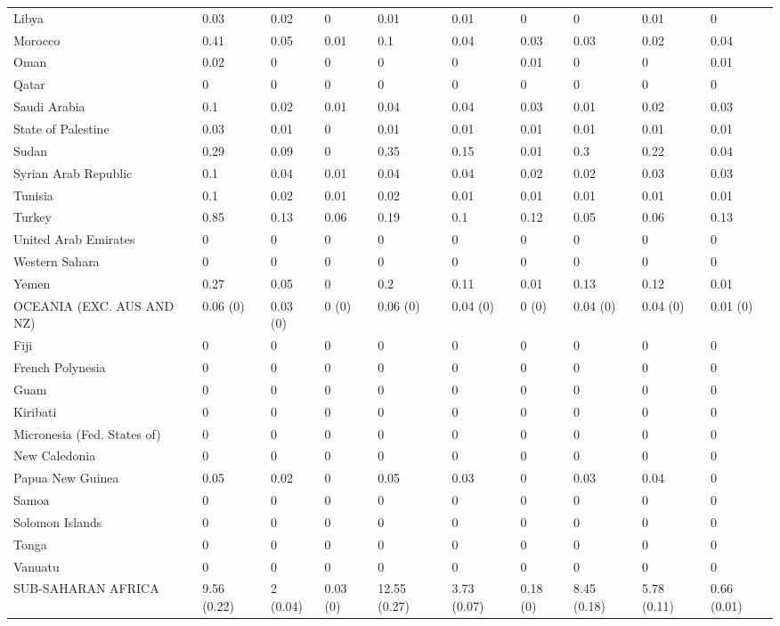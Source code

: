 \begin{longtable}[t]{llllllllll}
Libya & 0.03 & 0.02 & 0 & 0.01 & 0.01 & 0 & 0 & 0.01 & 0\\
Morocco & 0.41 & 0.05 & 0.01 & 0.1 & 0.04 & 0.03 & 0.03 & 0.02 & 0.04\\
Oman & 0.02 & 0 & 0 & 0 & 0 & 0.01 & 0 & 0 & 0.01\\
Qatar & 0 & 0 & 0 & 0 & 0 & 0 & 0 & 0 & 0\\
Saudi Arabia & 0.1 & 0.02 & 0.01 & 0.04 & 0.04 & 0.03 & 0.01 & 0.02 & 0.03\\
State of Palestine & 0.03 & 0.01 & 0 & 0.01 & 0.01 & 0.01 & 0.01 & 0.01 & 0.01\\
Sudan & 0.29 & 0.09 & 0 & 0.35 & 0.15 & 0.01 & 0.3 & 0.22 & 0.04\\
Syrian Arab Republic & 0.1 & 0.04 & 0.01 & 0.04 & 0.04 & 0.02 & 0.02 & 0.03 & 0.03\\
Tunisia & 0.1 & 0.02 & 0.01 & 0.02 & 0.01 & 0.01 & 0.01 & 0.01 & 0.01\\
Turkey & 0.85 & 0.13 & 0.06 & 0.19 & 0.1 & 0.12 & 0.05 & 0.06 & 0.13\\
United Arab Emirates & 0 & 0 & 0 & 0 & 0 & 0 & 0 & 0 & 0\\
Western Sahara & 0 & 0 & 0 & 0 & 0 & 0 & 0 & 0 & 0\\
Yemen & 0.27 & 0.05 & 0 & 0.2 & 0.11 & 0.01 & 0.13 & 0.12 & 0.01\\
OCEANIA (EXC. AUS AND NZ) & 0.06 (0) & 0.03 (0) & 0 (0) & 0.06 (0) & 0.04 (0) & 0 (0) & 0.04 (0) & 0.04 (0) & 0.01 (0)\\
Fiji & 0 & 0 & 0 & 0 & 0 & 0 & 0 & 0 & 0\\
French Polynesia & 0 & 0 & 0 & 0 & 0 & 0 & 0 & 0 & 0\\
Guam & 0 & 0 & 0 & 0 & 0 & 0 & 0 & 0 & 0\\
Kiribati & 0 & 0 & 0 & 0 & 0 & 0 & 0 & 0 & 0\\
Micronesia (Fed. States of) & 0 & 0 & 0 & 0 & 0 & 0 & 0 & 0 & 0\\
New Caledonia & 0 & 0 & 0 & 0 & 0 & 0 & 0 & 0 & 0\\
Papua New Guinea & 0.05 & 0.02 & 0 & 0.05 & 0.03 & 0 & 0.03 & 0.04 & 0\\
Samoa & 0 & 0 & 0 & 0 & 0 & 0 & 0 & 0 & 0\\
Solomon Islands & 0 & 0 & 0 & 0 & 0 & 0 & 0 & 0 & 0\\
Tonga & 0 & 0 & 0 & 0 & 0 & 0 & 0 & 0 & 0\\
Vanuatu & 0 & 0 & 0 & 0 & 0 & 0 & 0 & 0 & 0\\
SUB-SAHARAN AFRICA & 9.56 (0.22) & 2 (0.04) & 0.03 (0) & 12.55 (0.27) & 3.73 (0.07) & 0.18 (0) & 8.45 (0.18) & 5.78 (0.11) & 0.66 (0.01)\\

\end{longtable}
